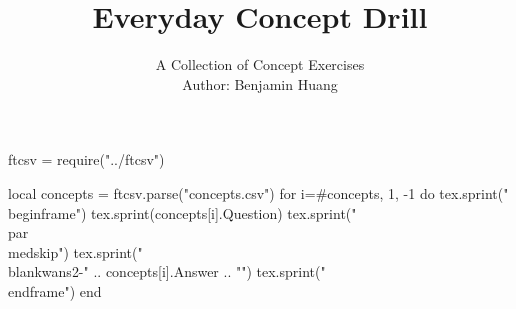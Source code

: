 \documentclass[10pt, aspectratio=169]{beamer}
\author[B.H.]{{\Large A Collection of Concept Exercises}\\\vspace{.5em} Author: Benjamin Huang}
\date{}
\title[Concept Drill]{Everyday Concept Drill}
\newcommand{\blankwans}[3][.]{\alt<#2>{{\color{red}\uline{#3}}#1}{\hrulefill#1}}
\begin{document}
\huge
\begin{luacode*}
ftcsv = require("../ftcsv")

local concepts = ftcsv.parse("concepts.csv")
for i=#concepts, 1, -1 do
    tex.sprint("\\begin{frame}")
    tex.sprint(concepts[i].Question)
    tex.sprint("\\par\\medskip")
    tex.sprint("\\blankwans{2-}{" .. concepts[i].Answer .. "}")
    tex.sprint("\\end{frame}")
end
\end{luacode*}
\end{document}
